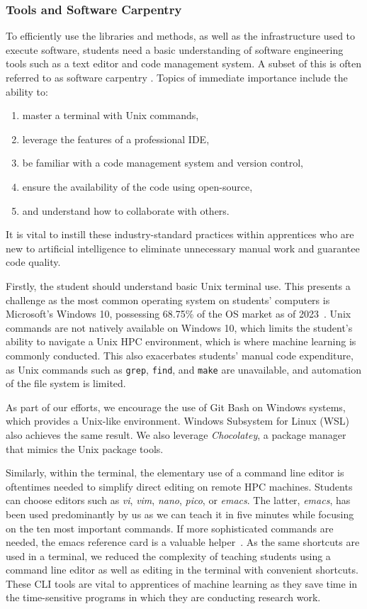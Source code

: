 \documentclass[utf8]{FrontiersinVancouver} %
\begin{document}
\subsubsection{Tools and Software Carpentry}\label{sec:tools}


To efficiently use the libraries and methods, as well as the infrastructure used to execute software, students need a basic understanding of software engineering tools such as a text editor and code management system. A subset of this is often referred to as software carpentry \cite{software-carpentry}. Topics of immediate importance include the ability to:

\begin{enumerate}
    \item master a terminal with Unix commands,
    \item leverage the features of a professional IDE,
    \item be familiar with a code management system and version control,
    \item ensure the availability of the code using open-source,
    \item and understand how to collaborate with others.
\end{enumerate}

It is vital to instill these industry-standard practices within apprentices who are new to artificial intelligence to eliminate unnecessary manual work and guarantee code quality.

Firstly, the student should understand basic Unix terminal use. This presents a challenge as the most common operating system on students' computers is Microsoft's Windows 10, possessing 68.75\% of the OS market as of 2023~\cite{norem}. Unix commands are not natively available on Windows 10, which limits the student's ability to navigate a Unix HPC environment, which is where machine learning is commonly conducted. This also exacerbates students' manual code expenditure, as Unix commands such as \verb|grep|, \verb|find|, and \verb|make| are unavailable, and automation of the file system is limited.

As part of our efforts, we encourage the use of Git Bash on Windows systems, which provides a Unix-like environment. Windows Subsystem for Linux (WSL) also achieves the same result. We also leverage {\em Chocolatey}, a package manager that mimics the Unix package tools.

Similarly, within the terminal, the elementary use of a command line editor is oftentimes needed to simplify direct editing on remote HPC machines. Students can choose editors such as {\em vi}, {\em vim}, {\em nano}, {\em pico}, or {\em emacs}. The latter, {\em emacs}, has been used predominantly by us as we can teach it in five minutes while focusing on the ten most important commands. If more sophisticated commands are needed, the emacs reference card is a valuable helper~\cite{emacs-reference}. As the same shortcuts are used in a terminal, we reduced the complexity of teaching students using a command line editor as well as editing in the terminal with convenient shortcuts. These CLI tools are vital to apprentices of machine learning as they save time in the time-sensitive programs in which they are conducting research work.
\end{document}

